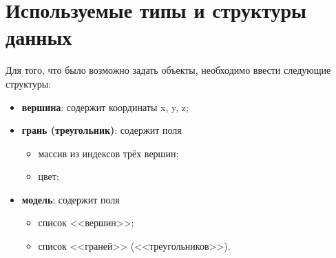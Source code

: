 \section{Используемые типы и структуры данных}
\hspace{0.6cm}Для того, что было возможно задать объекты, необходимо ввести следующие структуры:
\begin{itemize}
	\item \textbf{вершина}: содержит координаты x, y, z;
	\item \textbf{грань (треугольник)}: содержит поля
	\begin{itemize}
		\item массив из индексов трёх вершин;
		\item цвет;
	\end{itemize}
	\item \textbf{модель}: содержит поля
	\begin{itemize}
		\item список <<вершин>>;
		\item список <<граней>> (<<треугольников>>).
	\end{itemize}
\end{itemize}

